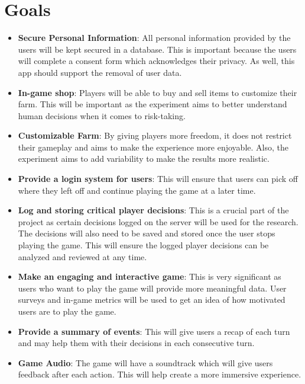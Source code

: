 \documentclass{article}
\begin{document}
\section{Goals}
\begin{itemize}
    \item \textbf{Secure Personal Information}: All personal information provided by the users will be kept secured in a database. This is important because the users will complete a consent form which acknowledges their privacy. As well, this app should support the removal of user data. 
    \item \textbf{In-game shop}: Players will be able to buy and sell items to customize their farm. This will be important as the experiment aims to better understand human decisions when it comes to risk-taking.
    \item \textbf{Customizable Farm}: By giving players more freedom, it does not restrict their gameplay and aims to make the experience more enjoyable. Also, the experiment aims to add variability to make the results more realistic.
    \item \textbf{Provide a login system for users}: This will ensure that users can pick off where they left off and continue playing the game at a later time. 
    \item \textbf{Log and storing critical player decisions}: This is a crucial part of the project as certain decisions logged on the server will be used for the research. The decisions will also need to be saved and stored once the user stops playing the game. This will ensure the logged player decisions can be analyzed and reviewed at any time.
    \item \textbf{Make an engaging and interactive game}: This is very significant as users who want to play the game will provide more meaningful data. User surveys and in-game metrics will be used to get an idea of how motivated users are to play the game.
    \item \textbf{Provide a summary of events}: This will give users a recap of each turn and may help them with their decisions in each consecutive turn. 
    \item \textbf{Game Audio}: The game will have a soundtrack which will give users feedback after each action. This will help create a more immersive experience.
\end{itemize}
\end{document}
